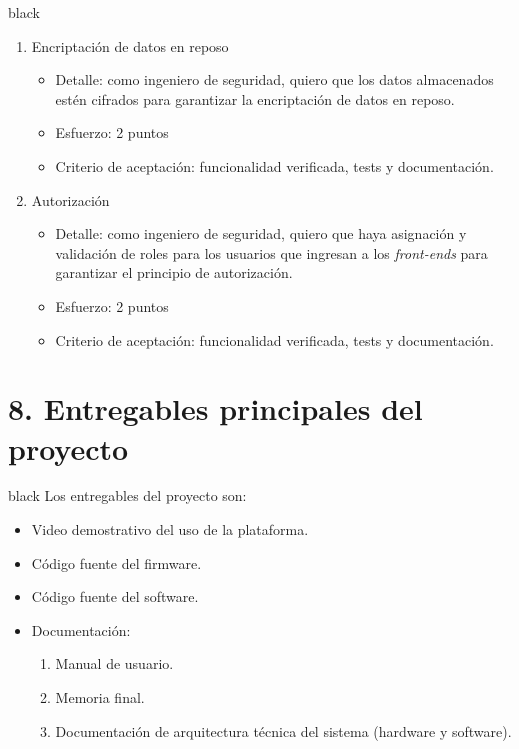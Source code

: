 \documentclass[
11pt, %
]{charter}
\begin{document}
\begin{consigna}{black}
\begin{enumerate}
\item Encriptación de datos en reposo
	\begin{itemize}
		\item Detalle: como ingeniero de seguridad, quiero que los datos almacenados estén cifrados para garantizar la encriptación de datos en reposo.
		\item Esfuerzo: 2 puntos
		\item Criterio de aceptación: funcionalidad verificada, tests y documentación.
	\end{itemize}

\item Autorización
	\begin{itemize}
		\item Detalle: como ingeniero de seguridad, quiero que haya asignación y validación de roles para los usuarios que ingresan a los \textit{front-ends }para garantizar el principio de autorización.
		\item Esfuerzo: 2 puntos
		\item Criterio de aceptación: funcionalidad verificada, tests y documentación.
	\end{itemize}


\end{enumerate}
\end{consigna}



\section{8. Entregables principales del proyecto}
\label{sec:entregables}
\begin{consigna}{black}
Los entregables del proyecto son:
\begin{itemize}
	\item Video demostrativo del uso de la plataforma. 		
	\item Código fuente del firmware.
	\item Código fuente del software.
	\item Documentación:
	\begin{enumerate}				
		\item Manual de usuario.
		\item Memoria final.
		\item Documentación de arquitectura técnica del sistema (hardware y software).
	\end{enumerate}	
	
\end{itemize}
\end{consigna}
\end{document}
